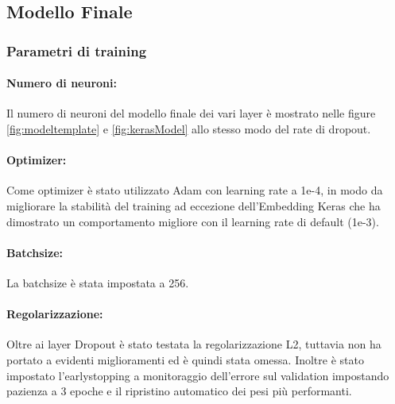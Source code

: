 \subsection{Modello Finale}
\subsubsection{Parametri di training}

\paragraph{Numero di neuroni:} Il numero di neuroni del modello finale dei vari
layer è mostrato nelle figure \ref{fig:modeltemplate} e \ref{fig:kerasModel}
allo stesso modo del rate di dropout.

\paragraph{Optimizer:} Come optimizer è stato utilizzato Adam con learning rate
a \mbox{1e-4}, in modo da migliorare la stabilità del training ad eccezione
dell'Embedding Keras che ha dimostrato un comportamento migliore con il learning
rate di default (1e-3).

\paragraph{Batchsize:} La batchsize è stata impostata a 256.

\paragraph{Regolarizzazione:} Oltre ai layer Dropout è stato testata la
regolarizzazione L2, tuttavia non ha portato a evidenti miglioramenti ed è
quindi stata omessa. Inoltre è stato impostato l'earlystopping a monitoraggio
dell'errore sul validation impostando pazienza a 3 epoche e il ripristino
automatico dei pesi più performanti.

